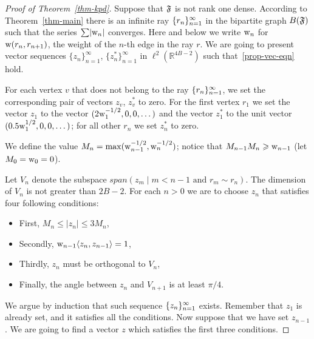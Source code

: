\documentclass[12pt,oneside,a4paper]{amsart}
\begin{document}
      \begin{proof}[Proof of Theorem~\ref{thm-kpd}]
        Suppose that $\mathfrak{F}$ is not rank one dense.
        According to Theorem~\ref{thm-main} there is an infinite ray $\{{r}_n\}_{n=1}^\infty$ in the bipartite
          graph $B(\mathfrak{F})$ such that the series $\sum\lvert\mathrm{w}_n\rvert$ converges.
        Here and below we write $\mathrm{w}_n$ for $\mathrm{w}(r_n, r_{n + 1})$, the weight of the $n$-th edge in the ray $r$.
        We are going to present vector sequences $\{z_n\}_{n=1}^\infty$, $\{z^*_n\}_{n=1}^\infty$ in $\ell^2 (\mathbb{R}^{4B-2})$
          such that~\eqref{prop-vec-eqn} hold.

        For each vertex $v$ that does not belong to the ray $\{{r}_n\}_{n=1}^\infty$, we set the corresponding pair of vectors $z_v$, $z^*_v$ to zero.
        For the first vertex $r_1$ we set the vector $z_1$ to the vector $(2\mathrm{w}^{-1/2}_1, 0, 0, \dots)$ and
          the vector $z^*_1$ to the unit vector $(0.5\mathrm{w}^{1/2}_1, 0, 0, \dots)$;
          for all other $r_n$ we set $z^*_n$ to zero.

        We define the value $M_n = \max(\mathrm{w}_{n-1}^{-1/2}, \mathrm{w}_n^{-1/2})$; notice that $M_{n - 1} M_n \geqslant \mathrm{w}_{n - 1}$ (let $M_0 = \mathrm{w}_0 = 0$).

        Let $V_n$ denote the subspace $span(z_m  \mid m < n - 1 \text{ and } r_m \sim r_n)$.
        The dimension of $V_n$ is not greater than $2B - 2$.
        For each $n > 0$ we are to choose $z_n$ that satisfies four following conditions:
        \begin{itemize}
          \item First, $M_n \leq \lvert z_n \rvert \leq 3 M_n$,
          \item Secondly, $\mathrm{w}_{n-1}\langle z_n, z_{n - 1} \rangle = 1$,
          \item Thirdly, $z_n$ must be orthogonal to $V_n$,
          \item Finally, the angle between $z_n$ and $V_{n + 1}$ is at least $\pi/4$.
        \end{itemize}

        We argue by induction that such sequence $\{{z}_n\}_{n=1}^\infty$ exists.
        Remember that $z_1$ is already set, and it satisfies all the conditions.
        Now suppose that we have set $z_{n - 1}$.
        We are going to find a vector $z$ which satisfies the first three conditions.


\end{proof}
\end{document}
